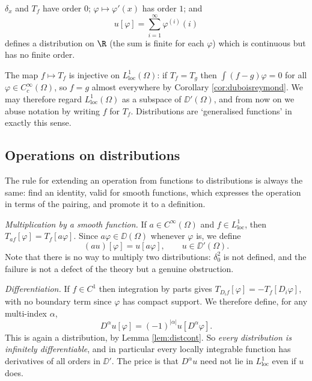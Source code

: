\begin{example}
	$\delta_x$ and $T_f$ have order $0$; $\varphi \mapsto \varphi'(x)$ has order $1$; and
	$$u[\varphi]=\sum_{i=1}^\infty \varphi^{(i)}(i)$$
	defines a distribution on $\R$ (the sum is finite for each $\varphi$) which is continuous but has no finite order.
\end{example}

The map $f \mapsto T_f$ is injective on $L^1_{\mathrm{loc}}(\Omega)$: if $T_f = T_g$ then $\int(f-g)\varphi = 0$ for all $\varphi\in C_c^\infty(\Omega)$, so $f = g$ almost everywhere by Corollary \ref{cor:duboisreymond}. We may therefore regard $L^1_{\mathrm{loc}}(\Omega)$ as a subspace of $\DD'(\Omega)$, and from now on we abuse notation by writing $f$ for $T_f$. Distributions are `generalised functions' in exactly this sense.

\subsection{Operations on distributions}

The rule for extending an operation from functions to distributions is always the same: find an identity, valid for smooth functions, which expresses the operation in terms of the pairing, and promote it to a definition.

\emph{Multiplication by a smooth function.} If $a \in C^\infty(\Omega)$ and $f \in L^1_{\mathrm{loc}}$, then $T_{af}[\varphi]=T_f[a\varphi]$. Since $a\varphi \in \DD(\Omega)$ whenever $\varphi$ is, we define
$$(au)[\varphi]=u[a\varphi], \qquad u \in \DD'(\Omega).$$
Note that there is no way to multiply two distributions: $\delta_0^2$ is not defined, and the failure is not a defect of the theory but a genuine obstruction.

\emph{Differentiation.} If $f \in C^1$ then integration by parts gives $T_{D_if}[\varphi]=-T_f[D_i\varphi]$, with no boundary term since $\varphi$ has compact support. We therefore define, for any multi-index $\alpha$,
$$D^\alpha u[\varphi]=(-1)^{|\alpha|}u[D^\alpha \varphi].$$
This is again a distribution, by Lemma \ref{lem:distcont}. So \emph{every distribution is infinitely differentiable}, and in particular every locally integrable function has derivatives of all orders in $\DD'$. The price is that $D^\alpha u$ need not lie in $L^1_{\mathrm{loc}}$ even if $u$ does.

